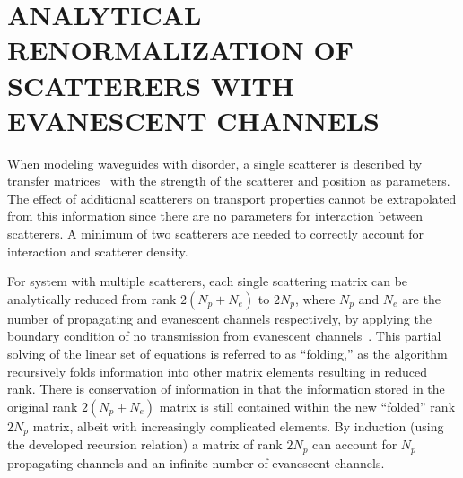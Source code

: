 
\section{ANALYTICAL RENORMALIZATION OF SCATTERERS WITH EVANESCENT CHANNELS}
\label{sec:renormalization}


When modeling waveguides with disorder, a single scatterer is described by transfer matrices~\cite{1981_MacKinnon_scaling,1992_Pendry,2003_Kettemann}
with the strength of the scatterer and position as parameters. The effect of additional scatterers on transport properties cannot be extrapolated from this information since there are no parameters for interaction between scatterers. A minimum of two scatterers are needed to correctly account for interaction and scatterer density. 

For system with multiple scatterers, each single scattering matrix can be analytically reduced from rank $2(N_p+N_e)$ to $2 N_p$, where $N_p$ and $N_e$ are the number of propagating and evanescent channels respectively, by applying the boundary condition of no transmission from evanescent channels~\cite{1990_Bagwell}. This partial solving of the linear set of equations is referred to as ``folding,'' as the algorithm recursively folds information into other matrix elements resulting in reduced rank.  There is conservation of information in that the information stored in the original rank $2(N_p+N_e)$ matrix is still contained within the new ``folded'' rank $2N_p$ matrix, albeit with increasingly complicated elements.  By induction (using the developed recursion relation) a matrix of rank $2N_p$ can account for $N_p$ propagating channels and an infinite number of evanescent channels. %


